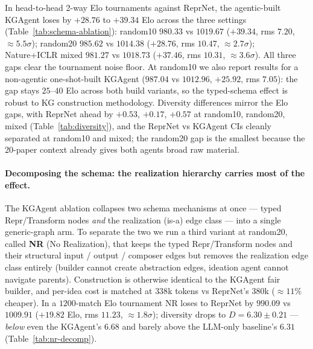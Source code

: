 \documentclass[10pt,twocolumn]{article}
\begin{document}
In head-to-head 2-way Elo tournaments against ReprNet, the
agentic-built KGAgent loses by $+28.76$ to $+39.34$ Elo across the
three settings (Table~\ref{tab:schema-ablation}): random10 $980.33$
vs $1019.67$ ($+39.34$, rms $7.20$, $\approx 5.5\sigma$); random20
$985.62$ vs $1014.38$ ($+28.76$, rms $10.47$, $\approx 2.7\sigma$);
Nature+ICLR mixed $981.27$ vs $1018.73$ ($+37.46$, rms $10.31$,
$\approx 3.6\sigma$).  All three gaps clear the tournament noise
floor.  At random10 we also report results for a non-agentic
one-shot-built KGAgent ($987.04$ vs $1012.96$, $+25.92$, rms
$7.05$): the gap stays $25$--$40$ Elo across both build variants,
so the typed-schema effect is robust to KG construction
methodology.  Diversity differences mirror the Elo gaps, with
ReprNet ahead by $+0.53$, $+0.17$, $+0.57$ at random10, random20,
mixed (Table~\ref{tab:diversity}), and the ReprNet vs KGAgent CIs
cleanly separated at random10 and mixed; the random20 gap is the
smallest because the 20-paper context already gives both agents
broad raw material.

\paragraph{Decomposing the schema: the realization hierarchy
carries most of the effect.}  The KGAgent ablation collapses two
schema mechanisms at once --- typed Repr/Transform nodes \emph{and}
the realization (is-a) edge class --- into a single generic-graph
arm.  To separate the two we run a third variant at random20,
called \textbf{NR} (No Realization), that keeps the
typed Repr/Transform nodes and their structural input / output /
composer edges but removes the realization edge class entirely
(builder cannot create abstraction edges, ideation agent cannot
navigate parents).  Construction is otherwise identical to the
KGAgent fair builder, and per-idea cost is matched at $338$k tokens
vs ReprNet's $380$k ($\approx 11\%$ cheaper).  In a $1200$-match
Elo tournament NR loses to ReprNet by $990.09$ vs $1009.91$
($+19.82$ Elo, rms $11.23$, $\approx 1.8\sigma$); diversity drops
to $D = 6.30 \pm 0.21$ --- \emph{below} even the KGAgent's $6.68$
and barely above the LLM-only baseline's $6.31$
(Table~\ref{tab:nr-decomp}).
\end{document}
